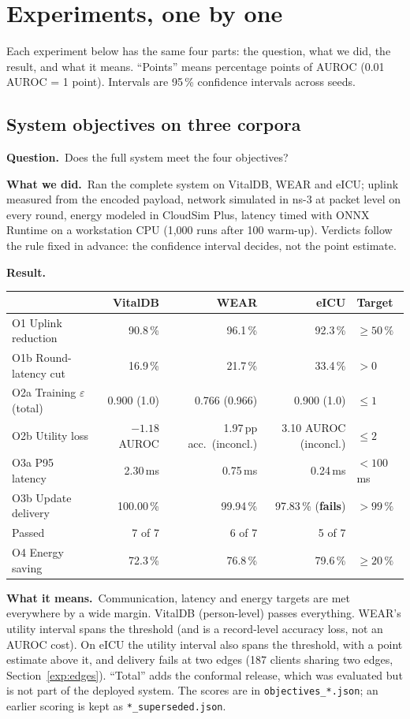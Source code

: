 \documentclass[11pt,a4paper]{article}
\newenvironment{experiment}[2]{\subsection{#1}\label{#2}}{}
\newcommand{\Q}{\par\textbf{Question.}\ }
\newcommand{\D}{\par\textbf{What we did.}\ }
\newcommand{\R}{\par\textbf{Result.}\ }
\newcommand{\M}{\par\textbf{What it means.}\ }
\begin{document}
\section{Experiments, one by one}

Each experiment below has the same four parts: the question, what we did,
the result, and what it means. ``Points'' means percentage points of AUROC
(0.01 AUROC = 1 point). Intervals are 95\,\% confidence intervals across seeds.

\begin{experiment}{System objectives on three corpora}{exp:obj}
\Q Does the full system meet the four objectives?
\D Ran the complete system on VitalDB, WEAR and eICU; uplink measured from the
encoded payload, network simulated in ns-3 at packet level on every round,
energy modeled in CloudSim Plus, latency timed with ONNX Runtime on a
workstation CPU (1{,}000 runs after 100 warm-up). Verdicts follow the rule fixed
in advance: the confidence interval decides, not the point estimate.
\R
\begin{center}\small
\begin{tabular}{lrrrl}
\toprule
& VitalDB & WEAR & eICU & Target \\
\midrule
O1 Uplink reduction & 90.8\,\% & 96.1\,\% & 92.3\,\% & $\ge 50\,\%$ \\
O1b Round-latency cut & 16.9\,\% & 21.7\,\% & 33.4\,\% & $>0$ \\
O2a Training $\varepsilon$ (total) & 0.900 (1.0) & 0.766 (0.966) & 0.900 (1.0) & $\le 1$ \\
O2b Utility loss & $-1.18$ AUROC & 1.97\,pp acc.\ (inconcl.) & 3.10 AUROC (inconcl.) & $\le 2$ \\
O3a P95 latency & 2.30\,ms & 0.75\,ms & 0.24\,ms & $<100$\,ms \\
O3b Update delivery & 100.00\,\% & 99.94\,\% & 97.83\,\% (\textbf{fails}) & $>99\,\%$ \\
\midrule
Passed & 7 of 7 & 6 of 7 & 5 of 7 & \\
O4 Energy saving & 72.3\,\% & 76.8\,\% & 79.6\,\% & $\ge 20\,\%$ \\
\bottomrule
\end{tabular}
\end{center}
\M Communication, latency and energy targets are met everywhere by a wide
margin. VitalDB (person-level) passes everything. WEAR's utility interval spans
the threshold (and is a record-level accuracy loss, not an AUROC cost). On eICU
the utility interval also spans the threshold, with a point estimate above it,
and delivery fails at two edges (187 clients sharing two edges,
Section~\ref{exp:edges}). ``Total'' adds the conformal release, which was
evaluated but is not part of the deployed system. The scores are in
\texttt{objectives\_*.json}; an earlier scoring is kept as
\texttt{*\_superseded.json}.
\end{experiment}
\end{document}
